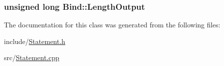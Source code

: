 \subsubsection[{Length\+Output}]{\setlength{\rightskip}{0pt plus 5cm}unsigned long Bind\+::\+Length\+Output\hspace{0.3cm}{\ttfamily [protected]}}\label{class_bind_aa47b0ebce3918a7a3d82c7aac91baa54}


The documentation for this class was generated from the following files\+:\begin{DoxyCompactItemize}
\item 
include/\hyperlink{_statement_8h}{Statement.\+h}\item 
src/\hyperlink{_statement_8cpp}{Statement.\+cpp}\end{DoxyCompactItemize}
